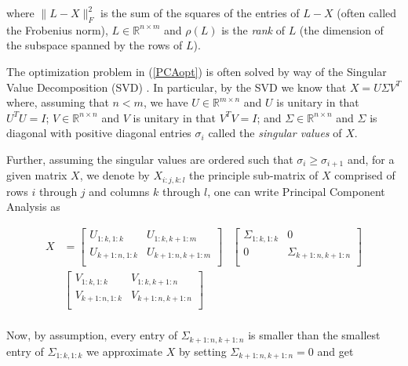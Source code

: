 \documentclass[conference]{IEEEtran}
\begin{document}
\noindent where $\| L-X \|_F^2$ is the sum of the squares of the entries of $L-X$ (often called the Frobenius norm), $L \in \mathbb{R}^{n \times m}$ and $\rho(L)$ is the \emph{rank} of $L$ (the dimension of the subspace spanned by the rows of $L$).

The optimization problem in (\ref{PCAopt}) is often solved by way of the Singular Value
Decomposition (SVD) \cite{Eckart1936}.  In particular, by the SVD we know that $X=U \Sigma V^T$ where, assuming that $n<m$, we have $U \in \mathbb{R}^{m \times n}$ and $U$ is unitary in that $U^T U = I$; $V \in \mathbb{R}^{n \times n}$ and $V$ is unitary in that $V^T V = I$; and $\Sigma \in \mathbb{R}^{n \times n}$ and $\Sigma$ is diagonal with positive diagonal entries $\sigma_i$ called the \emph{singular values} of $X$.

Further, assuming the singular values are ordered such that $\sigma_i \ge \sigma_{i+1}$
and, for a given matrix $X$, we denote by $X_{i:j,k:l}$ the principle sub-matrix of $X$ comprised of rows $i$ through $j$ and columns $k$ through $l$, one can write Principal Component Analysis as 

\begin{align*}
X 
& = 
\begin{bmatrix}
U_{1:k,1:k} & U_{1:k,k+1:m} \\
U_{k+1:n,1:k} & U_{k+1:n,k+1:m} \\
\end{bmatrix}
&
\begin{bmatrix}
\Sigma_{1:k,1:k} & 0 \\
0 & \Sigma_{k+1:n,k+1:n} \\
\end{bmatrix} \\
&
\begin{bmatrix}
V_{1:k,1:k} & V_{1:k,k+1:n} \\
V_{k+1:n,1:k} & V_{k+1:n,k+1:n} \\
\end{bmatrix} \\
\end{align*}

\noindent Now, by assumption, every entry of $\Sigma_{k+1:n,k+1:n}$ is smaller than the smallest
entry of $\Sigma_{1:k,1:k}$ we approximate $X$ by setting $\Sigma_{k+1:n,k+1:n}=0$
and get
\end{document}

